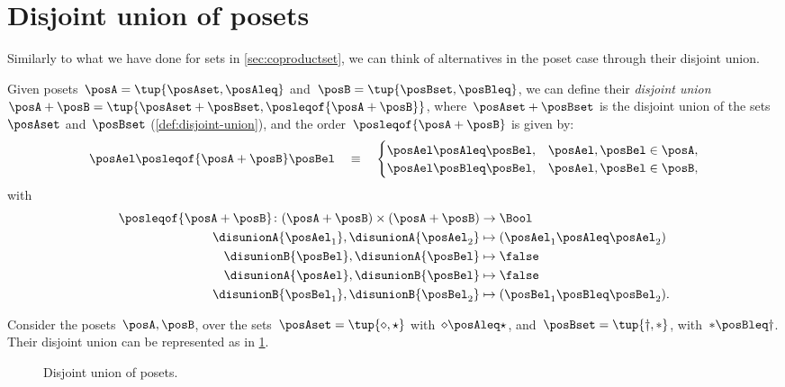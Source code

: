 
\section{Disjoint union of posets}
Similarly to what we have done for sets in \cref{sec:coproductset}, we can think of alternatives in the poset case through their disjoint union.

\begin{definition}
    Given posets~$\posA=\tup{\posAset, \posAleq}$ and~$\posB=\tup{\posBset, \posBleq}$, we can define their \emph{disjoint union}~$\posA+\posB=\tup{\posAset + \posBset, \posleqof{\posA + \posB}}$, where~$\posAset + \posBset$ is the disjoint union of the sets~$\posAset$ and~$\posBset$ (\cref{def:disjoint-union}), and the order~$\posleqof{\posA + \posB}$ is given by:
    \begin{equation}
        \posAel \posleqof{\posA + \posB} \posBel \quad\equiv\quad
        \begin{cases}
            \posAel \posAleq \posBel, & \posAel,\posBel \in \posA, \\
            \posAel \posBleq \posBel, & \posAel,\posBel \in \posB,
        \end{cases}
    \end{equation}
    with
    \begin{equation}
        \begin{aligned}
            \posleqof{\posA+\posB}\colon (\posA+\posB)\times (\posA+\posB) & \to \Bool                              \\
            \disunionA{\posAel_1},\disunionA{\posAel_2}                    & \mapsto (\posAel_1\posAleq \posAel_2)  \\
            \disunionB{\posBel},\disunionA{\posBel}                        & \mapsto \false                         \\
            \disunionA{\posAel},\disunionB{\posBel}                        & \mapsto \false                         \\
            \disunionB{\posBel_1},\disunionB{\posBel_2}                    & \mapsto (\posBel_1\posBleq \posBel_2).
        \end{aligned}
    \end{equation}
\end{definition}

\begin{example}
    Consider the posets~$\posA,\posB$, over the sets~$\posAset=\tup{\diamond, \star}$ with~$\diamond \posAleq \star$, and~$\posBset=\tup{\dagger,\ast}$, with~$\ast \posBleq \dagger$.
    Their disjoint union can be represented as in \cref{fig:poset-coproduct}.

    \begin{figure}[h!]
        \centering
        \caption{Disjoint union of posets.}
        \label{fig:poset-coproduct}
    \end{figure}
\end{example}
